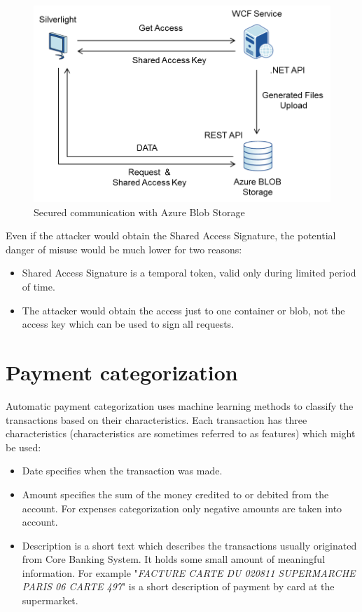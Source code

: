 \begin{figure}[h]
\begin{center}
\includegraphics[width=14cm]{figures/azure_storage_calls}
\caption{Secured communication with Azure Blob Storage}
\label{fig:azure_communication}
\end{center}
\end{figure}

Even if the attacker would obtain the Shared Access Signature, the potential danger of misuse would be much lower for two reasons:

\begin{itemize}
	\item Shared Access Signature is a temporal token, valid only during limited period of time.
	\item The attacker would obtain the access just to one container or blob, not the access key which can be used to sign all requests.	
\end{itemize}

\section{Payment categorization}
\label{analysis:payment_categorization}
Automatic payment categorization uses machine learning methods to classify the transactions based on their characteristics. Each transaction has three characteristics (characteristics are sometimes referred to as features) which might be used:

\begin{itemize}
	\item  Date specifies when the transaction was made.
	\item  Amount specifies the sum of the money credited to or debited from the account. For expenses categorization only negative amounts are taken into account.
	\item  Description is a short text which describes the transactions usually originated from Core Banking System. It holds some small amount of meaningful information. For example "\textit{FACTURE CARTE DU 020811 SUPERMARCHE PARIS 06 CARTE 497}" is a short description of payment by card at the supermarket.
\end{itemize}

